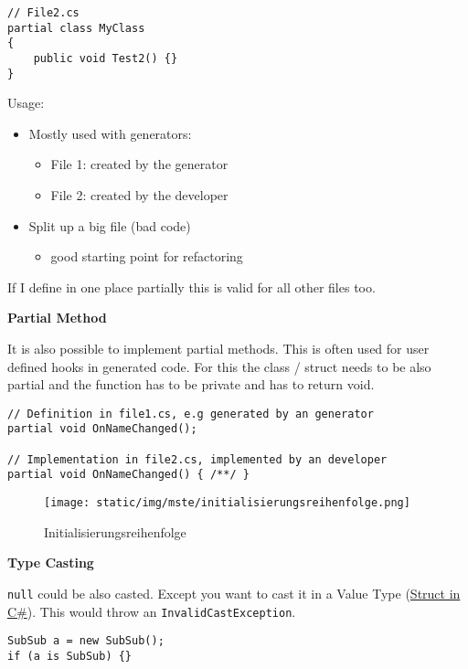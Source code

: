\documentclass[11pt,twoside,landscape]{article}
\begin{document}
\begin{multicols}{3}
\begin{lstlisting}
// File2.cs
partial class MyClass
{
    public void Test2() {}
}
\end{lstlisting}

Usage:
\begin{itemize}
\item Mostly used with generators:
\begin{itemize}
\item File 1: created by the generator
\item File 2: created by the developer
\end{itemize}
\item Split up a big file (bad code)
\begin{itemize}
\item good starting point for refactoring
\end{itemize}
\end{itemize}


If I define in one place partially this is valid for all other files too.

\textbf{Partial Method}

It is also possible to implement partial methods.
This is often used for user defined hooks in generated code.
For this the class / struct needs to be also partial and the function has to be private and has to return void.

\lstset{language=csharp,label= ,caption= ,captionpos=b,numbers=none}
\begin{lstlisting}
// Definition in file1.cs, e.g generated by an generator
partial void OnNameChanged();

// Implementation in file2.cs, implemented by an developer
partial void OnNameChanged() { /**/ }
\end{lstlisting}


\begin{figure}[htbp]
\centering
\texttt{[image: static/img/mste/initialisierungsreihenfolge.png]}
\caption{\label{fig:org73dfc7f}Initialisierungsreihenfolge}
\end{figure}

\textbf{Type Casting}

\texttt{null} could be also casted.
Except you want to cast it in a Value Type (\href{../../../roam/20211008085202-struct_in_c.org}{Struct in C\#}).
This would throw an \texttt{InvalidCastException}.
\lstset{language=csharp,label= ,caption= ,captionpos=b,numbers=none}
\begin{lstlisting}
SubSub a = new SubSub();
if (a is SubSub) {}
\end{lstlisting}


\end{multicols}
\end{document}
